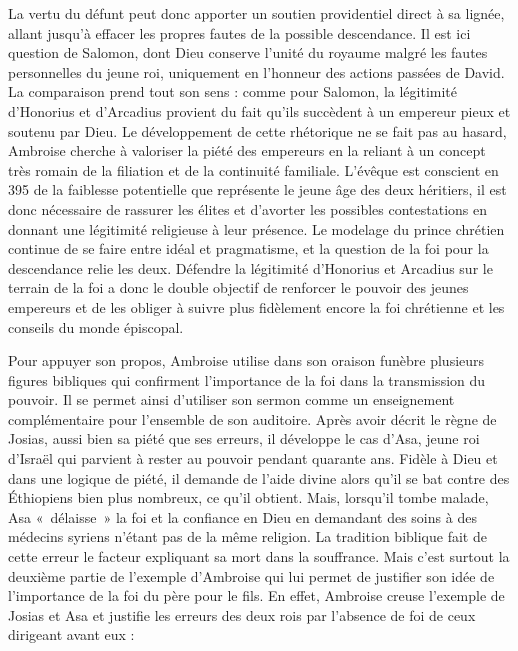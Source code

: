 \bigskip

La vertu du défunt peut donc apporter un soutien providentiel direct à sa lignée, allant jusqu'à effacer les propres fautes de la possible descendance. Il est ici question de Salomon, dont Dieu conserve l'unité du royaume malgré les fautes personnelles du jeune roi, uniquement en l’honneur des actions passées de David. La comparaison prend tout son sens : comme pour Salomon, la légitimité d’Honorius et d'Arcadius provient du fait qu'ils succèdent à un empereur pieux et soutenu par Dieu. Le développement de cette rhétorique ne se fait pas au hasard, Ambroise cherche à valoriser la piété des empereurs en la reliant à un concept très romain de la filiation et de la continuité familiale. L'évêque est conscient en 395 de la faiblesse potentielle que représente le jeune âge des deux héritiers, il est donc nécessaire de rassurer les élites et d'avorter les possibles contestations en donnant une légitimité religieuse à leur présence. Le modelage du prince chrétien continue de se faire entre idéal et pragmatisme, et la question de la foi pour la descendance relie les deux. Défendre la légitimité d'Honorius et Arcadius sur le terrain de la foi a donc le double objectif de renforcer le pouvoir des jeunes empereurs et de les obliger à suivre plus fidèlement encore la foi chrétienne et les conseils du monde épiscopal.

\bigskip

Pour appuyer son propos, Ambroise utilise dans son oraison funèbre plusieurs figures bibliques qui confirment l’importance de la foi dans la transmission du pouvoir. Il se permet ainsi d'utiliser son sermon comme un enseignement complémentaire pour l’ensemble de son auditoire. Après avoir décrit le règne de Josias, aussi bien sa piété que ses erreurs, il développe le cas d'Asa, jeune roi d'Israël qui parvient à rester au pouvoir pendant quarante ans. Fidèle à Dieu et dans une logique de piété, il demande de l’aide divine alors qu’il se bat contre des Éthiopiens bien plus nombreux, ce qu’il obtient. Mais, lorsqu’il tombe malade, Asa «~délaisse~» la foi et la confiance en Dieu en demandant des soins à des médecins syriens n’étant pas de la même religion. La tradition biblique fait de cette erreur le facteur expliquant sa mort dans la souffrance. Mais c’est surtout la deuxième partie de l’exemple d’Ambroise qui lui permet de justifier son idée de l’importance de la foi du père pour le fils. En effet, Ambroise creuse l’exemple de Josias et Asa et justifie les erreurs des deux rois par l’absence de foi de ceux dirigeant avant eux :

